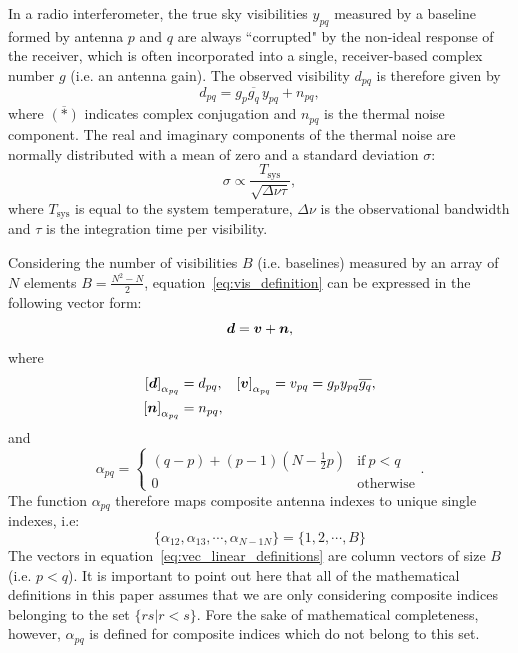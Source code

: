 \documentclass[useAMS,usenatbib]{mn2e}
\newcommand{\bd}{\bmath{d}}
\newcommand{\bv}{\bmath{v}}
\newcommand{\bn}{\bmath{n}}
\newcommand{\conj}[1]{\overline{#1}}
\begin{document}
In a radio interferometer, the true sky visibilities $y_{pq}$ measured by a baseline formed by antenna $p$ and $q$ are always ``corrupted" by the non-ideal response of the receiver, which is often incorporated into a single, receiver-based complex number $g$ (i.e. an antenna gain). The observed visibility $d_{pq}$ is therefore given by \citep{ME1,ME2,RRIME1}
\begin{equation}
\label{eq:vis_definition}
d_{pq} = g_{p}\conj{g_q} \, y_{pq} + n_{pq},
\end{equation}
where $\conj{(*)}$ indicates complex conjugation and $n_{pq}$ is the thermal noise component. 
The real and imaginary components of the thermal noise are normally distributed with a mean of zero and a
standard deviation $\sigma$:
\begin{equation}
\sigma \propto \frac{T_{\textrm{sys}}}{\sqrt{\Delta \nu \tau}},
\end{equation}
where $T_{\textrm{sys}}$ is equal to the system temperature, $\Delta \nu$ is the observational bandwidth and $\tau$ is the integration time per visibility.

Considering the number of visibilities $B$ (i.e. baselines) measured by an array of $N$ elements $B = \frac{N^2-N}{2}$, equation~\ref{eq:vis_definition} can be expressed in the following vector form:
\begin{equation}
\label{eq:vis_linear_definition}
\bd = \bv + \bn, 
\end{equation}
where 
\begin{align}
 \left [ \bd \right]_{\alpha_{pq}} &= d_{pq}, & \left [ \bv \right ]_{\alpha_{pq}} &= v_{pq}=g_p y_{pq} \conj{g_q},\nonumber\\
 \left [ \bn \right ]_{\alpha_{pq}} &= n_{pq}, &  &\label{eq:vec_linear_definitions}
\end{align}
and 
\begin{equation}
\alpha_{pq} =
\begin{cases}
(q-p) + (p-1)\left (N-\frac{1}{2}p \right ) & \textrm{if}~p<q\\
0 & \textrm{otherwise}
\end{cases}.
\end{equation}
The function $\alpha_{pq}$ therefore maps composite antenna indexes to unique single indexes, i.e:
\begin{equation}
\{\alpha_{12},\alpha_{13},\cdots,\alpha_{N-1N}\} = \{1,2,\cdots,B\} 
\end{equation}
The vectors in equation~\ref{eq:vec_linear_definitions} are column vectors of size $B$ (i.e. $p<q$). It is important to point out here that 
all of the mathematical definitions in this paper assumes that we are only considering composite indices belonging to the set $\{rs|r<s\}$. Fore the sake of mathematical 
completeness, however, $\alpha_{pq}$ is defined for composite indices which do not belong to this set.   
\end{document}

